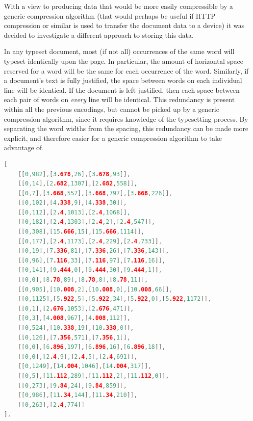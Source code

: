 With a view to producing data that would be more easily compressible by a generic compression algorithm (that would perhaps be useful if \textsc{HTTP} compression or similar is used to transfer the document data to a device) it was decided to investigate a different approach to storing this data.

In any typeset document, most (if not all) occurrences of the same word will typeset identically upon the page. In particular, the amount of horizontal space reserved for a word will be the same for each occurrence of the word. Similarly, if a document's text is fully justified, the space between words on each individual line will be identical. If the document is left-justified, then each space between each pair of words on \emph{every} line will be identical. This redundancy is present within all the previous encodings, but cannot be picked up by a generic compression algorithm, since it requires knowledge of the typesetting process. By separating the word widths from the spacing, this redundancy can be made more explicit, and therefore easier for a generic compression algorithm to take advantage of.

\begin{lstlisting}[label=lst:deltasdata,captionpos=b,float,language=c,stringstyle=\color{blue},basicstyle=\ttfamily\footnotesize,caption={[Excerpt from a paragraph tree using deltas]Excerpt from a JavaScript data file that uses position deltas in the Galley Structure Tree, representing one galley rendering of one paragraph. The first value in each pair is the position delta (in points) and the second is the dictionary key of the associated word.}]
[
    [[0,982],[3.678,26],[3.678,93]],
    [[0,14],[2.682,1307],[2.682,558]],
    [[0,7],[3.668,557],[3.668,797],[3.668,226]],
    [[0,102],[4.338,9],[4.338,30]],
    [[0,112],[2.4,1013],[2.4,1068]],
    [[0,182],[2.4,1303],[2.4,2],[2.4,547]],
    [[0,308],[15.666,15],[15.666,1114]],
    [[0,177],[2.4,1173],[2.4,229],[2.4,733]],
    [[0,19],[7.336,81],[7.336,26],[7.336,143]],
    [[0,96],[7.116,33],[7.116,97],[7.116,16]],
    [[0,141],[9.444,0],[9.444,30],[9.444,1]],
    [[0,0],[8.78,89],[8.78,8],[8.78,11]],
    [[0,905],[10.008,2],[10.008,0],[10.008,66]],
    [[0,1125],[5.922,5],[5.922,34],[5.922,0],[5.922,1172]],
    [[0,1],[2.676,1053],[2.676,471]],
    [[0,3],[4.008,967],[4.008,112]],
    [[0,524],[10.338,19],[10.338,0]],
    [[0,126],[7.356,571],[7.356,1]],
    [[0,0],[6.896,197],[6.896,16],[6.896,18]],
    [[0,0],[2.4,9],[2.4,5],[2.4,691]],
    [[0,1249],[14.004,1046],[14.004,317]],
    [[0,5],[11.112,289],[11.112,2],[11.112,0]],
    [[0,273],[9.84,24],[9.84,859]],
    [[0,986],[11.34,144],[11.34,210]],
    [[0,263],[2.4,774]]
],
\end{lstlisting}


